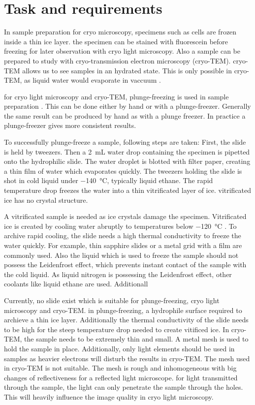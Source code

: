 \section{Task and requirements}

In sample preparation for cryo microscopy, specimens such as cells are frozen inside a thin ice layer. the specimen can be stained with fluorescein before freezing for later observation with cryo light microscopy. Also a sample can be prepared to study with cryo-transmission electron microscopy (cryo-TEM). cryo-TEM allows us to see samples in an hydrated state. This is only possible in cryo-TEM, as liquid water would evaporate in vaccuum \cite{Danino.2012}.

for cryo light microscopy and cryo-TEM, plunge-freezing is used in sample preparation \cite{Danino.2012} \cite{Faoro.2018}. This can be done either by hand or with a plunge-freezer. Generally the same result can be produced by hand as with a plunge freezer. In practice a plunge-freezer gives more consistent results.

To successfully plunge-freeze a sample, following steps are taken: First, the slide is held by tweezers. Then a \SI{2}{\milli\liter} water drop containing the specimen is pipetted onto the hydrophilic slide. The water droplet is blotted with filter paper, creating a thin film of water which evaporates quickly. The tweezers holding the slide is shot in cold liquid under \SI{-140}{\degreeCelsius}, typically liquid ethane. The rapid temperature drop freezes the water into a thin vitrificated layer of ice. vitrificated ice has no crystal structure.

A vitrificated sample is needed as ice crystals damage the specimen. Vitrificated ice is created by cooling water abruptly to temperatures below \SI{-120}{\degreeCelsius} \cite{Wowk.2010}. To archive rapid cooling, the slide needs a high thermal conductivity to freeze the water quickly. For example, thin sapphire slides or a metal grid with a film are commonly used. Also the liquid which is used to freeze the sample should not possess the Leidenfrost effect, which prevents instant contact of the sample with the cold liquid. As liquid nitrogen is possessing the Leidenfrost effect, other coolants like liquid ethane are used. Additionall

Currently, no slide exist which is suitable for plunge-freezing, cryo light microscopy and cryo-TEM. in plunge-freezing, a hydrophile surface required to archieve a thin ice layer. Additionally the thermal conductivity of the slide needs to be high for the steep temperature drop needed to create vitificed ice. In cryo-TEM, the sample needs to be extremely thin and small. A metal mesh is used to hold the sample in place. Additionally, only light elements should be used in samples as heavier electrons will disturb the results in cryo-TEM. The mesh used in cryo-TEM is not suitable. The mesh is rough and inhomogeneous with big changes of reflectiveness for a reflected light microscope. for light transmitted through the sample, the light can only penetrate the sample through the holes. This will heavily influence the image quality in cryo light microscopy.
 
